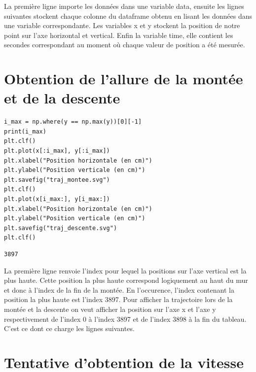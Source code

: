 \documentclass[11pt]{article}
\begin{document}
La première ligne importe les données dans une variable data, ensuite les lignes suivantes stockent chaque colonne du dataframe obtenu en lisant les
données dans une variable correspondante. Les variables x et y stockent la position de notre point sur l'axe horizontal et vertical. Enfin la variable
time, elle contient les secondes correspondant au moment où chaque valeur de position a été mesurée.
\section{Obtention de l'allure de la montée et de la descente}
\label{sec:org5083c4a}

\begin{verbatim}
i_max = np.where(y == np.max(y))[0][-1]
print(i_max)
plt.clf()
plt.plot(x[:i_max], y[:i_max])
plt.xlabel("Position horizontale (en cm)")
plt.ylabel("Position verticale (en cm)")
plt.savefig("traj_montee.svg")
plt.clf()
plt.plot(x[i_max:], y[i_max:])
plt.xlabel("Position horizontale (en cm)")
plt.ylabel("Position verticale (en cm)")
plt.savefig("traj_descente.svg")
plt.clf()
\end{verbatim}

\label{org7ef7d36}
\begin{verbatim}
3897
\end{verbatim}


La première ligne renvoie l'index pour lequel la positions sur l'axe vertical est la plus haute. Cette position la plus haute correspond
logiquement au haut du mur et donc à l'index de la fin de la montée. En l'occurence, l'index contenant la position la plus haute est l'index 3897.
Pour afficher la trajectoire lors de la montée et la descente on veut afficher la position sur l'axe x et l'axe y respectivement de l'index 0 à
l'index 3897 et de l'index 3898 à la fin du tableau. C'est ce dont ce charge les lignes suivantes.

\begin{center}

\end{center}

\begin{center}

\end{center}
\section{Tentative d'obtention de la vitesse}
\label{sec:orgeb25ace}
\end{document}
